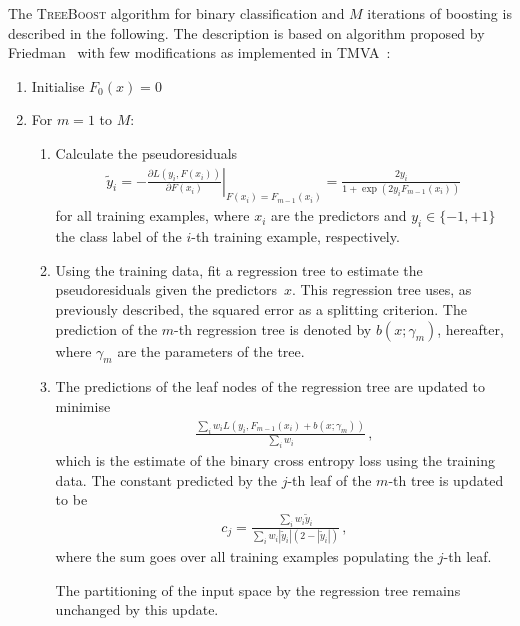 The \textsc{TreeBoost} algorithm for binary classification and $M$ iterations of
boosting is described in the following. The description is based on algorithm
proposed by Friedman~\cite{Friedman:2001wbq} with few modifications as
implemented in TMVA~\cite{TMVA}:
\begin{enumerate}
  \setlength{\itemsep}{0pt}

\item Initialise $F_0(x) = 0$

\item For $m = 1$ to $M$:
  \begin{enumerate}
    \setlength{\itemsep}{0pt}

  \item Calculate the pseudoresiduals
    \begin{align*}
      \tilde{y}_i
      = - \left. \frac{\partial L(y_i, F(x_i))}{\partial F(x_i)}\right|_{F(x_i) = F_{m - 1}(x_i)}
      = \frac{2 y_i}{1 + \exp(2 y_i F_{m-1}(x_i))}
    \end{align*}
    for all training examples, where $x_i$ are the predictors and
    $y_i \in \{ -1, +1 \}$ the class label of the $i$-th training example,
    respectively.

  \item Using the training data, fit a regression tree to estimate the
    pseudoresiduals given the predictors~$x$. This regression tree uses, as
    previously described, the squared error as a splitting criterion. The
    prediction of the $m$-th regression tree is denoted by $b(x; \gamma_{m})$,
    hereafter, where $\gamma_{m}$ are the parameters of the tree.

  \item The predictions of the leaf nodes of the regression tree are updated to
    minimise
    \begin{align*}
      \frac{ \sum_i w_i L(y_i, F_{m - 1}(x_i) + b(x; \gamma_{m})) }{ \sum_i w_i } \,\text{,}
    \end{align*}
    which is the estimate of the binary cross entropy loss using the training
    data. The constant predicted by the $j$-th leaf of the $m$-th tree is
    updated to be
    \begin{align*}
      c_{j} = \frac{ \sum_i w_i \tilde{y}_i }{ \sum_i w_i |\tilde{y}_i| (2 - |\tilde{y}_i|)} \,\text{,}
    \end{align*}
    where the sum goes over all training examples populating the $j$-th leaf.

    The partitioning of the input space by the regression tree remains unchanged
    by this update.


\end{enumerate}
\end{enumerate}
